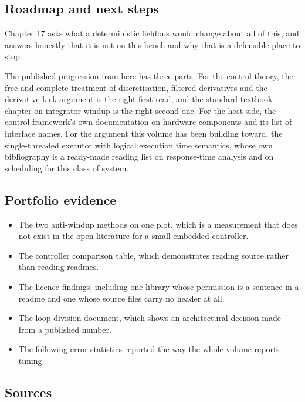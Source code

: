 \subsection*{Roadmap and next steps}

Chapter 17 asks what a deterministic fieldbus would change about all of this,
and answers honestly that it is not on this bench and why that is a defensible
place to stop.

The published progression from here has three parts. For the control theory, the
free and complete treatment of discretisation, filtered derivatives and the
derivative-kick argument is the right first read, and the standard textbook
chapter on integrator windup is the right second one. For the host side, the
control framework's own documentation on hardware components and its list of
interface names. For the argument this volume has been building toward, the
single-threaded executor with logical execution time semantics, whose own
bibliography is a ready-made reading list on response-time analysis and on
scheduling for this class of system.

\subsection*{Portfolio evidence}

\begin{itemize}
\item The two anti-windup methods on one plot, which is a measurement that does
not exist in the open literature for a small embedded controller.
\item The controller comparison table, which demonstrates reading source rather
than reading readmes.
\item The licence findings, including one library whose permission is a sentence
in a readme and one whose source files carry no header at all.
\item The loop division document, which shows an architectural decision made
from a published number.
\item The following error statistics reported the way the whole volume reports
timing.
\end{itemize}

\subsection*{Sources}

